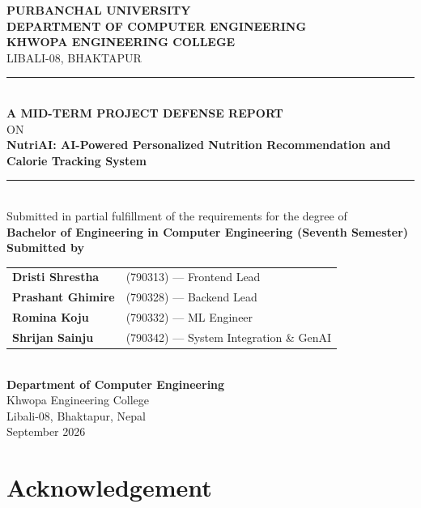 \documentclass[12pt,a4paper]{report}
\begin{document}
\begin{titlepage}
\centering
\vspace*{0.3cm}
{\large\bfseries PURBANCHAL UNIVERSITY}\\[0.15cm]
{\normalsize\bfseries DEPARTMENT OF COMPUTER ENGINEERING}\\[0.1cm]
{\normalsize\bfseries KHWOPA ENGINEERING COLLEGE}\\[0.1cm]
{\normalsize LIBALI-08, BHAKTAPUR}\\[0.9cm]
\rule{\textwidth}{1.2pt}\\[0.3cm]
{\large\bfseries A MID-TERM PROJECT DEFENSE REPORT}\\[0.2cm]
{\normalsize ON}\\[0.45cm]
{\Large\bfseries NutriAI: AI-Powered Personalized Nutrition Recommendation and Calorie Tracking System}\\[0.3cm]
\rule{\textwidth}{1.2pt}\\[0.6cm]

{\normalsize Submitted in partial fulfillment of the requirements for the degree of}\\[0.3cm]
{\normalsize\bfseries Bachelor of Engineering in Computer Engineering (Seventh Semester)}\\[1.2cm]

{\large\bfseries Submitted by}\\[0.4cm]
{\normalsize
\begin{tabular}{ll}
\textbf{Dristi Shrestha}  & (790313) --- Frontend Lead \\[0.18cm]
\textbf{Prashant Ghimire} & (790328) --- Backend Lead \\[0.18cm]
\textbf{Romina Koju}      & (790332) --- ML Engineer \\[0.18cm]
\textbf{Shrijan Sainju}   & (790342) --- System Integration \& GenAI
\end{tabular}}\\[1.2cm]

{\normalsize\bfseries Department of Computer Engineering}\\
{\normalsize Khwopa Engineering College}\\
{\normalsize Libali-08, Bhaktapur, Nepal}\\[0.3cm]
{\normalsize September 2026}
\end{titlepage}

\chapter*{Acknowledgement}
\thispagestyle{plain}
\end{document}
